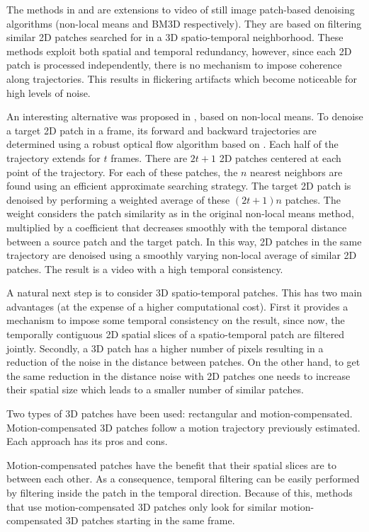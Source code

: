 \documentclass[10pt, journal, twocolumn, final, a4paper]{IEEEtran}
\begin{document}
The methods in \cite{Buades2005v} and \cite{Dabov2007v} are extensions to video
of still image patch-based denoising algorithms (non-local means \cite{Buades2006} and BM3D
\cite{Dabov2007tip} respectively). They are based on filtering similar 2D patches
searched for in a 3D spatio-temporal neighborhood. These methods exploit both
spatial and temporal redundancy, however, since each 2D patch is processed
independently, there is no mechanism to impose coherence along trajectories.
This results in flickering artifacts which become noticeable for high levels of
noise. 
%

An interesting alternative was proposed in \cite{Liu2010},
based on non-local means.
To denoise a target 2D patch in a frame, its forward and backward trajectories are
determined using a robust optical flow algorithm based on \cite{Bruhn2005}. 
Each half of the trajectory extends for $t$ frames. There are $2t + 1$ 2D patches
centered at each point of the trajectory.
For each of these patches, the $n$ nearest neighbors are found
using an efficient approximate searching strategy. The target 2D patch is denoised
by performing a weighted average of these $(2t + 1)n$ patches. The weight considers
the patch similarity as in the original non-local means method, multiplied by a coefficient
that decreases smoothly with the temporal distance between a source patch and the target patch.
%
In this way, 2D patches in the same trajectory are denoised using a smoothly
varying non-local average of similar 2D patches. The result is a video with
a high temporal consistency.

A natural next step is to consider 3D spatio-temporal patches. This has two
main advantages (at the expense of a higher computational cost). First it
provides a mechanism to impose some temporal consistency on the result, since
now, the temporally contiguous 2D spatial slices of a spatio-temporal patch
are filtered jointly. Secondly, a 3D patch has a higher number of pixels
resulting in a reduction of the noise in the distance between patches. On the
other hand, to get the same reduction in the distance noise with 2D patches one
needs to increase their spatial size which leads to a smaller number of similar
patches.

Two types of 3D patches have been used: rectangular and motion-compensated.
Motion-compensated 3D patches follow a motion trajectory previously estimated.
Each approach has its pros and cons.

Motion-compensated patches have the benefit that their spatial slices are 
to between each other. As a consequence, temporal filtering can be easily performed by
filtering inside the patch in the temporal direction. 
Because of this, methods that use motion-compensated 3D patches only look for
similar motion-compensated 3D patches starting in the same frame.
\end{document}

